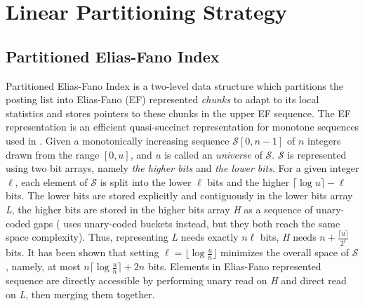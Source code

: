 \documentclass[runningheads,a4paper]{llncs}
\begin{document}
\section{Linear Partitioning Strategy}\label{sec:our method}
\subsection{Partitioned Elias-Fano Index}

Partitioned Elias-Fano Index is a two-level data structure which partitions the posting list into Elias-Fano (EF) represented \textit{chunks} to adapt to its local statistics and stores pointers to these chunks in the upper EF sequence.
The EF representation is an efficient quasi-succinct representation for monotone sequences used in \cite{elias1974efficient,vigna2013quasi}.
Given a monotonically increasing sequence $ \mathcal{S}[0, n-1] $ of $ n $ integers drawn from the range $ [0, u] $, and $ u $ is called an \textit{universe} of $ \mathcal{S} $.
$ \mathcal{S} $ is represented using two bit arrays, namely \textit{the higher bits} and \textit{the lower bits}.
For a given integer $ \ell $, each element of $ \mathcal{S} $ is split into the lower $ \ell $ bits and the higher $ \lceil \log u \rceil - \ell$ bits.
The lower bits are stored explicitly and contiguously in the lower bits array \textit{L}, the higher bits are stored in the higher bits array \textit{H} as a sequence of unary-coded gaps (\cite{ottaviano2014partitioned} uses unary-coded buckets instead, but they both reach the same space complexity).
Thus, representing \textit{L} needs exactly $ n\ell $ bits, \textit{H} needs $ n + \frac{\lceil u \rceil}{2^{\ell}} $ bits.
It has been shown that setting $ \ell = \lfloor \log \frac{u}{n} \rfloor $ minimizes the overall space of $ \mathcal{S} $, namely, at most $ n \lceil \log \frac{u}{n} \rceil + 2 n $ bits.
Elements in Elias-Fano represented sequence are directly accessible by performing unary read on \textit{H} and direct read on \textit{L}, then merging them together.
\end{document}
